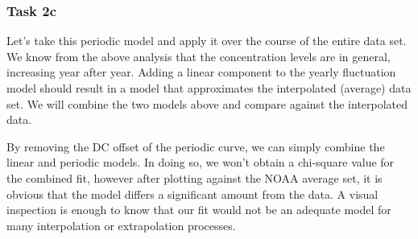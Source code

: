 \documentclass[11pt]{article}
\begin{document}
\subsubsection{Task 2c}\label{task-2c}

Let's take this periodic model and apply it over the course of the
entire data set. We know from the above analysis that the concentration
levels are in general, increasing year after year. Adding a linear
component to the yearly fluctuation model should result in a model that
approximates the interpolated (average) data set. We will combine the
two models above and compare against the interpolated data.

By removing the DC offset of the periodic curve, we can simply combine
the linear and periodic models. In doing so, we won't obtain a
chi-square value for the combined fit, however after plotting against
the NOAA average set, it is obvious that the model differs a significant
amount from the data. A visual inspection is enough to know that our fit
would not be an adequate model for many interpolation or extrapolation
processes.
\end{document}
